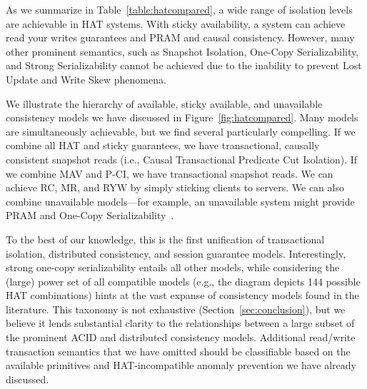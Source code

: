 {As we summarize in Table~\ref{table:hatcompared}, a wide range of
isolation levels are achievable in HAT systems. With sticky
availability, a system can achieve read your writes guarantees and
PRAM and causal consistency. However, many other prominent semantics,
such as Snapshot Isolation, One-Copy Serializability, and Strong
Serializability cannot be achieved due to the inability to prevent
Lost Update and Write Skew phenomena.

We illustrate the hierarchy of available, sticky available, and
unavailable consistency models we have discussed in
Figure~\ref{fig:hatcompared}. Many models are simultaneously
achievable, but we find several particularly compelling. If we combine
all HAT and sticky guarantees, we have transactional, causally
consistent snapshot reads (i.e., Causal Transactional Predicate Cut
Isolation). If we combine MAV and P-CI, we have transactional snapshot
reads. We can achieve RC, MR, and RYW by simply sticking clients to
servers. We can also combine unavailable models---for example, an
unavailable system might provide PRAM and One-Copy
Serializability~\cite{daudjee-session}.

To the best of our knowledge, this is the first unification of
transactional isolation, distributed consistency, and session
guarantee models. Interestingly, strong one-copy serializability
entails all other models, while considering the (large) power set of
all compatible models (e.g., the diagram depicts 144 possible HAT
combinations) hints at the vast expanse of consistency models found in
the literature. This taxonomy is not exhaustive
(Section~\ref{sec:conclusion}), but we believe it lends substantial
clarity to the relationships between a large subset of the prominent
ACID and distributed consistency models. Additional read/write
transaction semantics that we have omitted should be classifiable
based on the available primitives and HAT-incompatible anomaly
prevention we have already discussed.

}
